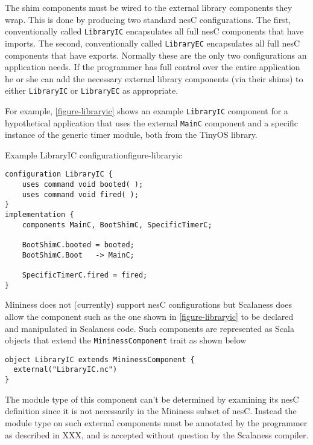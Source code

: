 The shim components must be wired to the external library components they wrap. This is done by
producing two standard nesC configurations. The first, conventionally called
\lstinline!LibraryIC! encapsulates all full nesC components that have imports. The second,
conventionally called \lstinline!LibraryEC! encapsulates all full nesC components that have
exports. Normally these are the only two configurations an application needs. If the programmer
has full control over the entire application he or she can add the necessary external library
components (via their shims) to either \lstinline!LibraryIC! or \lstinline!LibraryEC! as
appropriate.

For example, \autoref{figure-libraryic} shows an example \lstinline!LibraryIC! component for a
hypothetical application that uses the external \lstinline!MainC! component and a specific
instance of the generic timer module, both from the TinyOS library. 

\singlespace
\begin{fpfig}[tbhp]{Example LibraryIC configuration}{figure-libraryic}
{
\begin{lstlisting}[language=nesC]
configuration LibraryIC {
    uses command void booted( );
    uses command void fired( );
}
implementation {
    components MainC, BootShimC, SpecificTimerC;

    BootShimC.booted = booted;
    BootShimC.Boot   -> MainC;

    SpecificTimerC.fired = fired;
}
\end{lstlisting}
}
\end{fpfig}
\primaryspacing

Mininess does not (currently) support nesC configurations but Scalaness does allow the component
such as the one shown in \autoref{figure-libraryic} to be declared and manipulated in Scalaness
code. Such components are represented as Scala objects that extend the
\lstinline!MininessComponent! trait as shown below

\singlespace
\vspace{1.0ex}
\begin{lstlisting}[language=scalaness]
object LibraryIC extends MininessComponent {
  external("LibraryIC.nc")
}
\end{lstlisting}
\vspace{1.0ex}
\primaryspacing

The module type of this component can't be determined by examining its nesC definition since it
is not necessarily in the Mininess subset of nesC. Instead the module type on such external
components must be annotated by the programmer as described in XXX, and is accepted without
question by the Scalaness compiler.

